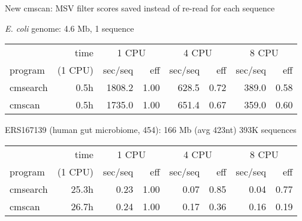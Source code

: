 \documentclass[landscape]{slides}
\begin{document}
\begin{slide}
\begin{center}
New cmscan: MSV filter scores saved instead of re-read for each sequence
\medskip

\tt

\tiny
\emph{E. coli} genome: 4.6 Mb, 1 sequence

\begin{tabular}{l|r|rr|rr|rr}
         & time    & \multicolumn{2}{c}{1 CPU} & \multicolumn{2}{c}{4 CPU} & \multicolumn{2}{c}{8 CPU} \\ \cline{3-8}
program  & (1 CPU) & sec/seq & eff & sec/seq & eff & sec/seq & eff \\ \hline
cmsearch & 0.5h & 1808.2 & 1.00 & 628.5 & 0.72 & 389.0 & 0.58 \\
cmscan   & 0.5h & 1735.0 & 1.00 & 651.4 & 0.67 & 359.0 & 0.60 \\
\end{tabular}


\medskip

\medskip

ERS167139 (human gut microbiome, 454): 166 Mb (avg 423nt) 393K sequences 

\begin{tabular}{l|r|rr|rr|rr}
         & time    & \multicolumn{2}{c}{1 CPU} & \multicolumn{2}{c}{4 CPU} & \multicolumn{2}{c}{8 CPU} \\ \cline{3-8}
program  & (1 CPU) & sec/seq & eff & sec/seq & eff & sec/seq & eff \\ \hline
cmsearch & 25.3h & 0.23 & 1.00 & 0.07 & 0.85 & 0.04 & 0.77 \\
cmscan   & 26.7h & 0.24 & 1.00 & 0.17 & 0.36 & 0.16 & 0.19 \\ 
\end{tabular}


\end{center}
\end{slide}
\end{document}
